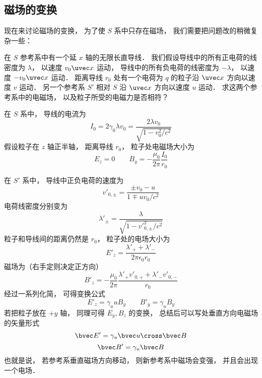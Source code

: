 
\subsection{磁场的变换}
现在来讨论磁场的变换， 为了使 $S$ 系中只存在磁场， 我们需要把问题改的稍微复杂一些：

在 $S$ 参考系中有一个延 $x$ 轴的无限长直导线． 我们假设导线中的所有正电荷的线密度为 $\lambda$， 以速度 $v_0\uvec x$ 运动， 导线中的所有负电荷的线密度为 $-\lambda$，  以速度 $-v_0\uvec x$ 运动． 距离导线 $r_0$ 处有一个电荷为 $q$ 的粒子沿 $\uvec x$ 方向以速度 $v$ 运动． 另一个参考系 $S'$ 相对 $S$ 沿 $\uvec x$ 方向以速度 $u$ 运动． 求这两个参考系中的电磁场， 以及粒子所受的电磁力是否相符？

在 $S$ 系中， 导线的电流为
\begin{equation}
I_0 = 2 \gamma_0 \lambda v_0 = \frac{2 \lambda v_0}{\sqrt{1 - v_0^2/c^2}}
\end{equation}
假设粒子在 $z$ 轴正半轴， 距离导线 $r_0$， 粒子处电磁场大小为
\begin{equation}
E_z = 0 \qquad B_y = -\frac{\mu_0}{2\pi} \frac{I_0}{r_0}
\end{equation}

在 $S'$ 系中， 导线中正负电荷的速度为
\begin{equation}
v'_{0, \pm} = \frac{\pm v_0-u}{1 \mp uv_0/c^2}
\end{equation}
电荷线密度分别变为
\begin{equation}
\lambda'_\pm = \frac{\lambda}{\sqrt{1 - v'^2_{0,\pm}/c^2}}
\end{equation}
粒子和导线间的距离仍然是 $r_0$， 粒子处的电场大小为
\begin{equation}
E'_z = \frac{\lambda'_+ + \lambda'_-}{2 \pi \epsilon_{0} r_0}
\end{equation}
磁场为（右手定则决定正方向）
\begin{equation}
B'_z = -\frac{\mu_0}{2\pi} \frac{\lambda'_+ v'_{0,+} + \lambda'_- v'_{0,-}}{r_0}
\end{equation}
经过一系列化简， 可得变换公式
\begin{equation}
E'_z = \gamma_u u B_y
\qquad
B'_y = \gamma_u B_y
\end{equation}
若把粒子放在 $+y$ 轴， 同理可得 $E_y, B_z$ 的变换， 总结后可以写处垂直方向电磁场的矢量形式
\begin{equation}\label{EMRef_eq3}
\bvec E' = \gamma_u \bvec u \cross \bvec B
\end{equation}
\begin{equation}\label{EMRef_eq4}
\bvec B' = \gamma_u \bvec B
\end{equation}
也就是说， 若参考系垂直磁场方向移动， 则新参考系中磁场会变强， 并且会出现一个电场．

